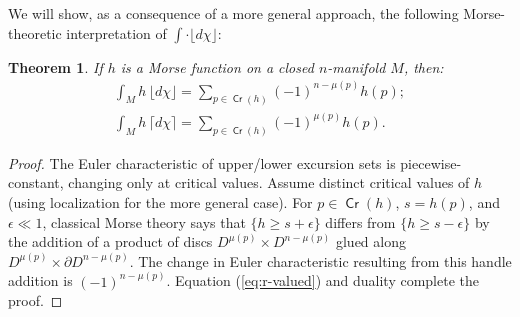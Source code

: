 \documentclass{psapm-l}
\newtheorem{theorem}{Theorem}[section]
\theoremstyle{definition}
\theoremstyle{remark}
\numberwithin{equation}{section}
\begin{document}
We will show, as a consequence of a more general approach, the following Morse-theoretic interpretation of $\int\cdot{{\lfloor d\chi\rfloor}}$:
\begin{theorem}
\label{thm:morse}
If $h$ is a Morse function on a closed $n$-manifold $M$, then:
\begin{align}
\label{eq:morse}
    \int_M h\,{{\lfloor d\chi\rfloor}}
    =
    \sum_{p\in{{{\operatorname{\mathsf{{Cr}}}}}}(h)}(-1)^{n-\mu(p)}h(p)
    ;
\\
\label{eq:morse2}
    \int_M h\,{{\lceil d\chi\rceil}}
    =
    \sum_{p\in{{{\operatorname{\mathsf{{Cr}}}}}}(h)}(-1)^{\mu(p)}h(p)
    .
\end{align}
\end{theorem}
\begin{proof}
The Euler characteristic of upper/lower excursion sets is piecewise-constant, changing only at critical values. Assume distinct critical values of $h$ (using localization for the more general case). For $p\in{{{\operatorname{\mathsf{{Cr}}}}}}(h)$, $s=h(p)$, and $\epsilon\ll 1$, classical Morse theory \cite{Milnor} says that $\{h\geq s+\epsilon\}$ differs from $\{h\geq s-\epsilon\}$ by the addition of a product of discs $D^{\mu(p)}\times D^{n-\mu(p)}$ glued along $D^{\mu(p)}\times {\partial} D^{n-\mu(p)}$. The change in Euler characteristic resulting from this handle addition is $(-1)^{n-\mu(p)}$. Equation (\ref{eq:r-valued}) and duality complete the proof.
\end{proof}
\end{document}

